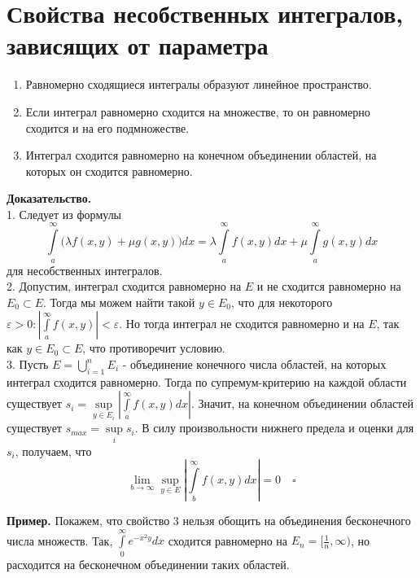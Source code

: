 \section{Свойства несобственных интегралов, зависящих от параметра}
\begin{enumerate}
    \item Равномерно сходящиеся интегралы образуют линейное пространство.
    \item Если интеграл равномерно сходится на множестве, то он равномерно
        сходится и на его подмножестве.
    \item Интеграл сходится равномерно на конечном объединении областей, на
        которых он сходится равномерно.
\end{enumerate}
\textbf{Доказательство.}\\
1. Следует из формулы
$$\int\limits_{a}^{\infty}\big(\lambda f(x,y)+\mu g(x,y)\big)dx = 
\lambda \int\limits_{a}^{\infty}f(x,y)dx + \mu \int\limits_{a}^{\infty}
g(x,y)dx$$
для несобственных интегралов.\\
2. Допустим, интеграл сходится равномерно на $E$ и не сходится равномерно на
$E_0\subset E$. Тогда мы можем найти такой $y\in E_0$, что для
некоторого $\varepsilon>0:\left| \int\limits_{a}^{\infty}f(x,y) \right| <
\varepsilon$. Но тогда интеграл не сходится равномерно и на $E$, 
так как  $y\in E_0\subset E$, что противоречит условию.\\
3. Пусть $E=\bigcup\limits_{i=1}^nE_i$ - объединение конечного числа областей,
на которых интеграл сходится равномерно. Тогда по супремум-критерию на каждой
области существует 
$s_i=\sup\limits_{y\in E_i}\left| \int\limits_{a}^{\infty}f(x,y)dx\right|$. 
Значит, на конечном объединении областей существует 
$s_{max}=\sup\limits_{i}s_i$. В силу произвольности нижнего предела и 
оценки для $s_i$, получаем, что  
$$\lim\limits_{b \to \infty}\sup\limits_{y\in E}\left|\int\limits_{b}^{\infty}
f(x,y)dx\right|=0\quad \square $$


\textbf{Пример.} Покажем, что свойство 3 нельзя обощить на объединения
бесконечного числа множеств. Так, $\int\limits_{0}^{\infty}e^{-x^2y}dx$
сходится равномерно на $E_n=[\frac{1}{n},\infty)$, но расходится на 
бесконечном объединении таких областей. 


